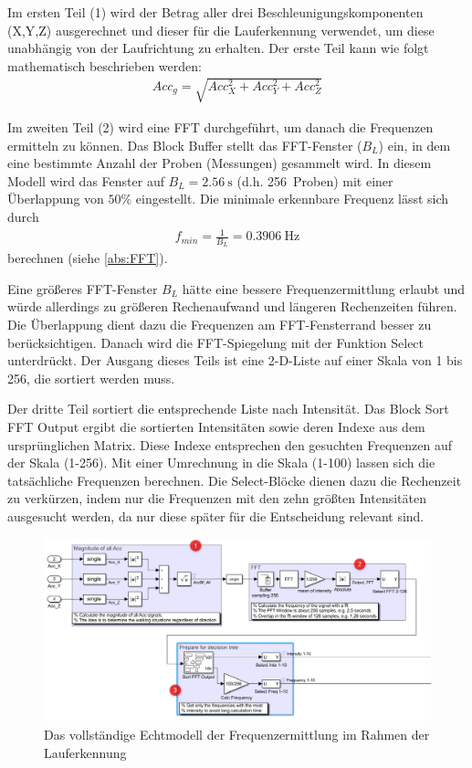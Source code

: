 Im ersten Teil (1) wird der Betrag aller drei Beschleunigungskomponenten (X,Y,Z) ausgerechnet und dieser für die Lauferkennung verwendet, um diese unabhängig von der Laufrichtung zu erhalten. Der erste Teil kann wie folgt mathematisch beschrieben werden:
\begin{align*}
	Acc_g = \sqrt{ Acc_X^2 + Acc_Y^2 + Acc_Z^2}
\end{align*}

Im zweiten Teil (2) wird eine FFT durchgeführt, um danach die Frequenzen ermitteln zu können. Das Block \glqq Buffer\grqq{} stellt das FFT-Fenster ($B_L$) ein, in dem eine bestimmte Anzahl der Proben (Messungen) gesammelt wird. In diesem Modell wird das Fenster auf $B_L = \SI{2,56}{\second}$ (d.h. \SI{256}{Proben}) mit einer Überlappung von $50\%$ eingestellt. Die minimale erkennbare Frequenz lässt sich durch
\begin{align*}
	f_{min} = \frac{1}{B_L} = \SI{0,3906}{\hertz}
\end{align*}
berechnen (siehe \autoref{abs:FFT}).

Eine größeres FFT-Fenster $B_L$ hätte eine bessere Frequenzermittlung erlaubt und würde allerdings zu größeren Rechenaufwand und längeren Rechenzeiten führen. Die Überlappung dient dazu die Frequenzen am FFT-Fensterrand besser zu berücksichtigen. Danach wird die FFT-Spiegelung mit der Funktion \glqq Select\grqq{} unterdrückt. Der Ausgang dieses Teils ist eine 2-D-Liste auf einer Skala von 1 bis 256, die sortiert werden muss.

Der dritte Teil sortiert die entsprechende Liste nach Intensität. Das Block \glqq Sort FFT Output\grqq{} ergibt die sortierten Intensitäten sowie deren Indexe aus dem ursprünglichen Matrix. Diese Indexe entsprechen den gesuchten Frequenzen auf der Skala (1-256). Mit einer Umrechnung in die Skala (1-100) lassen sich die tatsächliche Frequenzen berechnen. Die \glqq Select\grqq{}-Blöcke dienen dazu die Rechenzeit zu verkürzen, indem nur die Frequenzen mit den zehn größten Intensitäten ausgesucht werden, da nur diese später für die Entscheidung relevant sind.

\begin{figure}
	\centering
	\includegraphics[width=\linewidth]{Bilder/Lauferkennung_Modell_1_1.png}
	\caption{Das vollständige Echtmodell der Frequenzermittlung im Rahmen der Lauferkennung}
	\label{fig:Lauferkennung_Freqbasiert_FFT_Echtmodell}
\end{figure}

